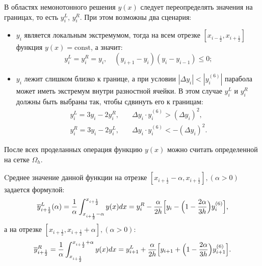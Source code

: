 \documentclass[12pt,a4paper]{article}
\newcommand{\half}{\frac{1}{2}}
\begin{document}
    В областях немонотонного решения $ y(x) $ следует переопределять значения на границах, то есть $ y_i^L,\, y_i^R $. При этом возможны два сценария:
    \begin{itemize}
        \item $ y_i $ является локальным экстремумом, тогда на всем отрезке $ [x_{i-\half}, x_{i+\half}] $ функция $ y(x) = \text{const} $, а значит:
        \begin{equation}
            \label{local_sup}
            y_i^L = y_i^R = y_i, \quad (y_{i+1} - y_i)(y_i - y_{i-1}) \leq 0;
        \end{equation}
                
        \item $ y_i $ лежит слишком близко к границе, а при условии $|\Delta y_i| < | y_i^{(6)} |$ парабола может иметь экстремум внутри разностной ячейки. В этом случае $ y_i^L $ и $ y_i^R $ должны быть выбраны так, чтобы сдвинуть его к границам:
        \begin{equation}
            \label{boundary_sup}
            \begin{split}
                y_i^L = 3y_i -2y_i^R, &\quad \Delta y_i \cdot y_i^{(6)} > (\Delta y_i)^2, \\
                y_i^R = 3y_i -2y_i^L, &\quad \Delta y_i \cdot y_i^{(6)} < -(\Delta y_i)^2.
            \end{split}  
        \end{equation}
    \end{itemize}

    После всех проделанных операция функцию $y(x)$ можно считать определенной на сетке $\Omega_h$. 
    
    Cреднее значение данной функции на отрезке $ [x_{i+\half}-\alpha, x_{i+\half}], (\alpha > 0) $ задается формулой:
    \begin{equation}
        \label{average_positive}
        \overline y_{i+\half}^L(\alpha) = \dfrac{1}{\alpha} \displaystyle \int_{x_{i+\half}-\alpha}^{x_{i+\half}} y(x) dx = y_i^R - \dfrac{\alpha}{2h}\Bigl[ \Delta y_i - \Bigl( 1 - \dfrac{2 \alpha}{3h} \Bigr)y_i^{(6)} \Bigr],
    \end{equation}
    \noindent а на отрезке $ [x_{i+\half}, x_{i+\half}+\alpha], (\alpha > 0)$:
    \begin{equation}
        \label{average_negative}
        \overline y_{i+\half}^R = \dfrac{1}{\alpha} \displaystyle \int_{x_{i+\half}}^{x_{i+\half}+\alpha} y(x) dx = y_{i+1}^L  + \dfrac{\alpha}{2h} \Bigl[\Delta y_{i+1} + \Bigl( 1 - \dfrac{2\alpha}{3h} \Bigr) y_{i+1}^{(6)} \Bigr].
    \end{equation}
\end{document}

